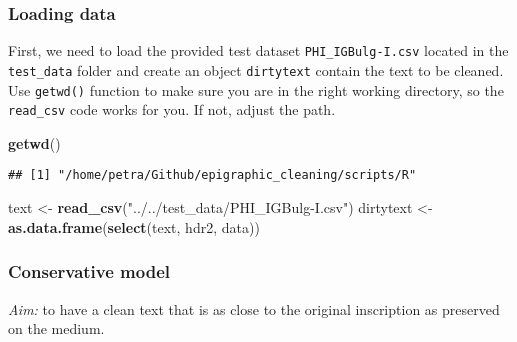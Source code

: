 \documentclass[]{article}
\newenvironment{Shaded}{\begin{snugshade}}{\end{snugshade}}
\newcommand{\KeywordTok}[1]{\textcolor[rgb]{0.13,0.29,0.53}{\textbf{#1}}}
\newcommand{\NormalTok}[1]{#1}
\newcommand{\StringTok}[1]{\textcolor[rgb]{0.31,0.60,0.02}{#1}}
\begin{document}
\hypertarget{loading-data}{%
\subsubsection{Loading data}\label{loading-data}}

First, we need to load the provided test dataset
\texttt{PHI\_IGBulg-I.csv} located in the \texttt{test\_data} folder and
create an object \texttt{dirtytext} contain the text to be cleaned. Use
\texttt{getwd()} function to make sure you are in the right working
directory, so the \texttt{read\_csv} code works for you. If not, adjust
the path.

\begin{Shaded}
\begin{Highlighting}[]
\KeywordTok{getwd}\NormalTok{()}
\end{Highlighting}
\end{Shaded}

\begin{verbatim}
## [1] "/home/petra/Github/epigraphic_cleaning/scripts/R"
\end{verbatim}

\begin{Shaded}
\begin{Highlighting}[]
\NormalTok{text <-}\StringTok{ }\KeywordTok{read_csv}\NormalTok{(}\StringTok{"../../test_data/PHI_IGBulg-I.csv"}\NormalTok{)}
\NormalTok{dirtytext <-}\StringTok{ }\KeywordTok{as.data.frame}\NormalTok{(}\KeywordTok{select}\NormalTok{(text, hdr2, data))}
\end{Highlighting}
\end{Shaded}

\hypertarget{conservative-model}{%
\subsubsection{Conservative model}\label{conservative-model}}

\emph{Aim:} to have a clean text that is as close to the original
inscription as preserved on the medium.
\end{document}
